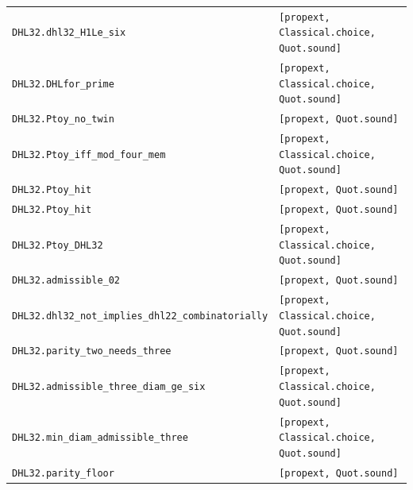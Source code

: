 \documentclass[11pt]{amsart}
\theoremstyle{plain}
\theoremstyle{definition}
\theoremstyle{remark}
\begin{document}
\begin{center}
\begin{tabular}{ll}
\texttt{DHL32.dhl32\_H1Le\_six} & \texttt{[propext, Classical.choice, Quot.sound]} \\
\texttt{DHL32.DHLfor\_prime} & \texttt{[propext, Classical.choice, Quot.sound]} \\
\texttt{DHL32.Ptoy\_no\_twin} & \texttt{[propext, Quot.sound]} \\
\texttt{DHL32.Ptoy\_iff\_mod\_four\_mem} & \texttt{[propext, Classical.choice, Quot.sound]} \\
\texttt{DHL32.Ptoy\_hit} & \texttt{[propext, Quot.sound]} \\
\texttt{DHL32.Ptoy\_hit\textquotesingle{}} & \texttt{[propext, Quot.sound]} \\
\texttt{DHL32.Ptoy\_DHL32} & \texttt{[propext, Classical.choice, Quot.sound]} \\
\texttt{DHL32.admissible\_02} & \texttt{[propext, Quot.sound]} \\
\texttt{DHL32.dhl32\_not\_implies\_dhl22\_combinatorially} & \texttt{[propext, Classical.choice, Quot.sound]} \\
\texttt{DHL32.parity\_two\_needs\_three} & \texttt{[propext, Quot.sound]} \\
\texttt{DHL32.admissible\_three\_diam\_ge\_six} & \texttt{[propext, Classical.choice, Quot.sound]} \\
\texttt{DHL32.min\_diam\_admissible\_three} & \texttt{[propext, Classical.choice, Quot.sound]} \\
\texttt{DHL32.parity\_floor} & \texttt{[propext, Quot.sound]} \\
\hline
\end{tabular}
\end{center}



\end{document}
